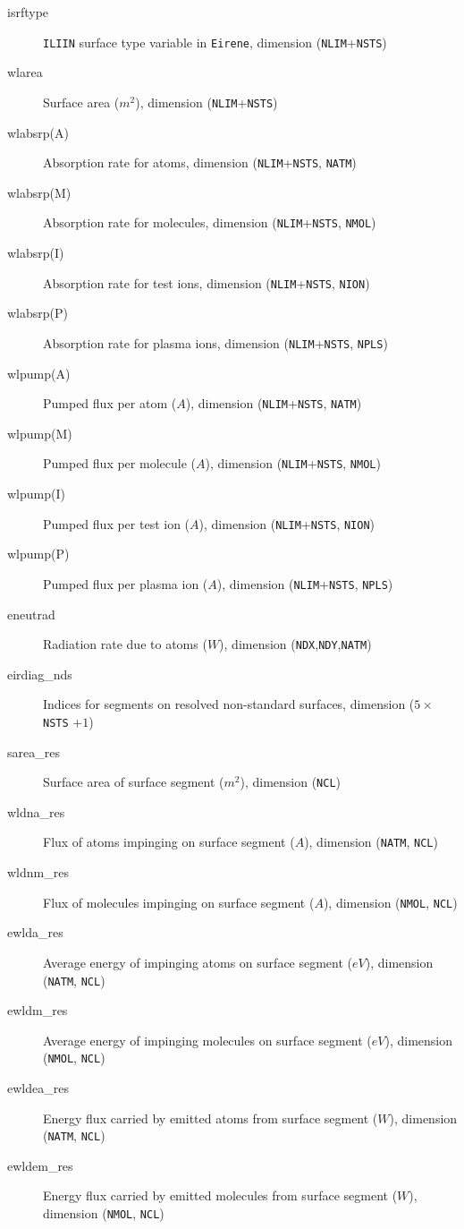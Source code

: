 \documentclass[a4paper,10pt]{report}
\begin{document}
\begin{description}
  \item[isrftype] {\tt ILIIN} surface type variable in {\tt Eirene}, dimension ({\tt NLIM}+{\tt NSTS})
  \item[wlarea] Surface area ($m^2$), dimension ({\tt NLIM}+{\tt NSTS})
  \item[wlabsrp(A)] Absorption rate for atoms, dimension ({\tt NLIM}+{\tt NSTS}, {\tt NATM})
  \item[wlabsrp(M)] Absorption rate for molecules, dimension ({\tt NLIM}+{\tt NSTS}, {\tt NMOL})
  \item[wlabsrp(I)] Absorption rate for test ions, dimension ({\tt NLIM}+{\tt NSTS}, {\tt NION})
  \item[wlabsrp(P)] Absorption rate for plasma ions, dimension ({\tt NLIM}+{\tt NSTS}, {\tt NPLS})
  \item[wlpump(A)] Pumped flux per atom ($A$), dimension ({\tt NLIM}+{\tt NSTS}, {\tt NATM})
  \item[wlpump(M)] Pumped flux per molecule ($A$), dimension ({\tt NLIM}+{\tt NSTS}, {\tt NMOL})
  \item[wlpump(I)] Pumped flux per test ion ($A$), dimension ({\tt NLIM}+{\tt NSTS}, {\tt NION})
  \item[wlpump(P)] Pumped flux per plasma ion ($A$), dimension ({\tt NLIM}+{\tt NSTS}, {\tt NPLS})
  \item[eneutrad] Radiation rate due to atoms ($W$), dimension ({\tt NDX},{\tt NDY},{\tt NATM})
  \item[eirdiag\_nds] Indices for segments on resolved non-standard surfaces, dimension ($5 \times$ {\tt NSTS} $+ 1$)
  \item[sarea\_res] Surface area of surface segment ($m^2$), dimension ({\tt NCL})
  \item[wldna\_res] Flux of atoms impinging on surface segment ($A$), dimension ({\tt NATM}, {\tt NCL})
  \item[wldnm\_res] Flux of molecules impinging on surface segment ($A$), dimension ({\tt NMOL}, {\tt NCL})
  \item[ewlda\_res] Average energy of impinging atoms on surface segment ($eV$), dimension ({\tt NATM}, {\tt NCL})
  \item[ewldm\_res] Average energy of impinging molecules on surface segment ($eV$), dimension ({\tt NMOL}, {\tt NCL})
  \item[ewldea\_res] Energy flux carried by emitted atoms from surface segment ($W$), dimension ({\tt NATM}, {\tt NCL})
  \item[ewldem\_res] Energy flux carried by emitted molecules from surface segment ($W$), dimension ({\tt NMOL}, {\tt NCL})

\end{description}
\end{document}
